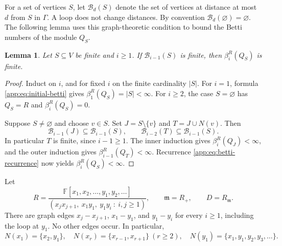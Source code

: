 \documentclass[11pt]{article}
\numberwithin{equation}{section}
\newtheorem{lemma}[theorem]{Lemma}
\theoremstyle{definition}
\theoremstyle{remark}
\begin{document}
For a set of vertices $S$, let $\mathcal B_d(S)$ denote the set of vertices at distance at most $d$ from $S$ in $\Gamma$.  A loop does not change distances.  By convention $\mathcal B_d(\varnothing)=\varnothing$.  The following lemma uses this graph-theoretic condition to bound the Betti numbers of the module $Q_S$.
\begin{lemma}\label{app:lem:radius}
Let $S\subseteq V$ be finite and $i\ge1$.  If $\mathcal B_{i-1}(S)$ is finite, then $\beta_i^R(Q_S)$ is finite.
\end{lemma}
\begin{proof}
Induct on $i$, and for fixed $i$ on the finite cardinality $|S|$.  For $i=1$, formula \eqref{app:eq:initial-betti} gives $\beta_1^R(Q_S)=|S|<\infty$.  For $i\ge2$, the case $S=\varnothing$ has $Q_S=R$ and $\beta_i^R(Q_S)=0$.

Suppose $S\ne\varnothing$ and choose $v\in S$.  Set $J=S\setminus\{v\}$ and $T=J\cup N(v)$.  Then
\[
\mathcal B_{i-1}(J)\subseteq\mathcal B_{i-1}(S),
\qquad
\mathcal B_{i-2}(T)\subseteq\mathcal B_{i-1}(S).
\]
In particular $T$ is finite, since $i-1\ge1$.  The inner induction gives $\beta_i^R(Q_J)<\infty$, and the outer induction gives $\beta_{i-1}^R(Q_T)<\infty$.  Recurrence \eqref{app:eq:betti-recurrence} now yields $\beta_i^R(Q_S)<\infty$.
\end{proof}

Let
\[
R=\frac{\mathbb F[x_1,x_2,\ldots,y_1,y_2,\ldots]}
{(x_jx_{j+1},\ x_1y_1,\ y_1y_i\ :\ i,j\ge1)},
\qquad \mathfrak m=R_+,\qquad D=R_{\mathfrak m}.
\tag{8}\label{app:eq:example-rings}
\]
There are graph edges $x_j\! -\! x_{j+1}$, $x_1\! -\! y_1$, and $y_1\! -\! y_i$ for every $i\ge1$, including the loop at $y_1$.  No other edges occur.  In particular,
\[
N(x_1)=\{x_2,y_1\},\quad
N(x_r)=\{x_{r-1},x_{r+1}\}\ (r\ge2),\quad
N(y_1)=\{x_1,y_1,y_2,y_3,\ldots\}.
\tag{9}\label{app:eq:example-neighbors}
\]
\end{document}
